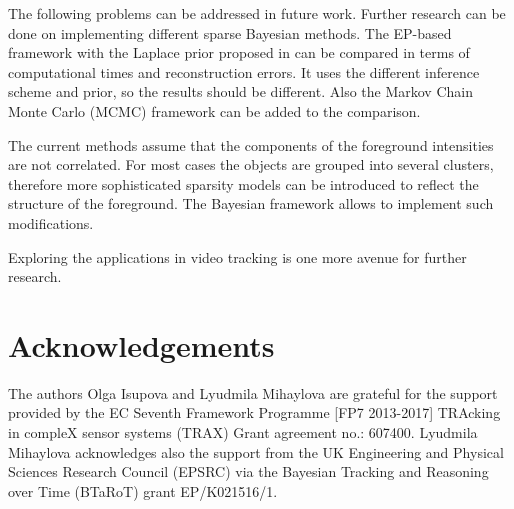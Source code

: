 \documentclass[conference]{IEEEtran}
\begin{document}
The following problems can be addressed in future work.
Further research can be done on implementing different sparse Bayesian methods. The EP-based framework with the Laplace prior proposed in \cite{Seeger08} can be compared in terms of computational times and reconstruction errors. It uses the different inference scheme and prior, so the results should be different. Also the Markov Chain Monte Carlo (MCMC) \cite{Casella08} framework can be added to the comparison.

The current methods assume that the components of the foreground intensities are not correlated. For most cases the objects are grouped into several clusters, therefore more sophisticated sparsity models can be introduced to reflect the structure of the foreground. The Bayesian framework allows to implement such modifications. 

Exploring the applications in video tracking is one more avenue for further research.

\section{Acknowledgements}
The authors Olga Isupova and Lyudmila Mihaylova are grateful for the support provided by the EC Seventh Framework Programme [FP7 2013-2017] TRAcking in compleX sensor systems (TRAX) Grant agreement no.: 607400. Lyudmila Mihaylova acknowledges also the support from the UK Engineering and Physical Sciences Research Council (EPSRC) via the Bayesian Tracking and Reasoning over Time (BTaRoT) grant EP/K021516/1.


\end{document}
